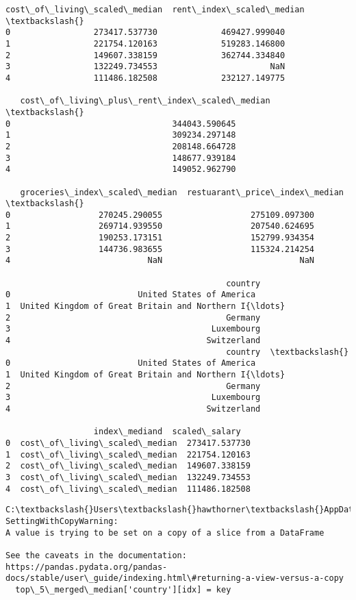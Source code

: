 \documentclass[11pt]{article}
\begin{document}
    \begin{Verbatim}[commandchars=\\\{\}]
   cost\_of\_living\_scaled\_median  rent\_index\_scaled\_median  \textbackslash{}
0                 273417.537730             469427.999040
1                 221754.120163             519283.146800
2                 149607.338159             362744.334840
3                 132249.734553                       NaN
4                 111486.182508             232127.149775

   cost\_of\_living\_plus\_rent\_index\_scaled\_median  \textbackslash{}
0                                 344043.590645
1                                 309234.297148
2                                 208148.664728
3                                 148677.939184
4                                 149052.962790

   groceries\_index\_scaled\_median  restuarant\_price\_index\_median  \textbackslash{}
0                  270245.290055                  275109.097300
1                  269714.939550                  207540.624695
2                  190253.173151                  152799.934354
3                  144736.983655                  115324.214254
4                            NaN                            NaN

                                             country
0                          United States of America
1  United Kingdom of Great Britain and Northern I{\ldots}
2                                            Germany
3                                         Luxembourg
4                                        Switzerland
                                             country  \textbackslash{}
0                          United States of America
1  United Kingdom of Great Britain and Northern I{\ldots}
2                                            Germany
3                                         Luxembourg
4                                        Switzerland

                  index\_mediand  scaled\_salary
0  cost\_of\_living\_scaled\_median  273417.537730
1  cost\_of\_living\_scaled\_median  221754.120163
2  cost\_of\_living\_scaled\_median  149607.338159
3  cost\_of\_living\_scaled\_median  132249.734553
4  cost\_of\_living\_scaled\_median  111486.182508
    \end{Verbatim}

    \begin{Verbatim}[commandchars=\\\{\}]
C:\textbackslash{}Users\textbackslash{}hawthorner\textbackslash{}AppData\textbackslash{}Local\textbackslash{}Temp\textbackslash{}ipykernel\_22188\textbackslash{}4077783730.py:33:
SettingWithCopyWarning:
A value is trying to be set on a copy of a slice from a DataFrame

See the caveats in the documentation: https://pandas.pydata.org/pandas-
docs/stable/user\_guide/indexing.html\#returning-a-view-versus-a-copy
  top\_5\_merged\_median['country'][idx] = key
    \end{Verbatim}
\end{document}
